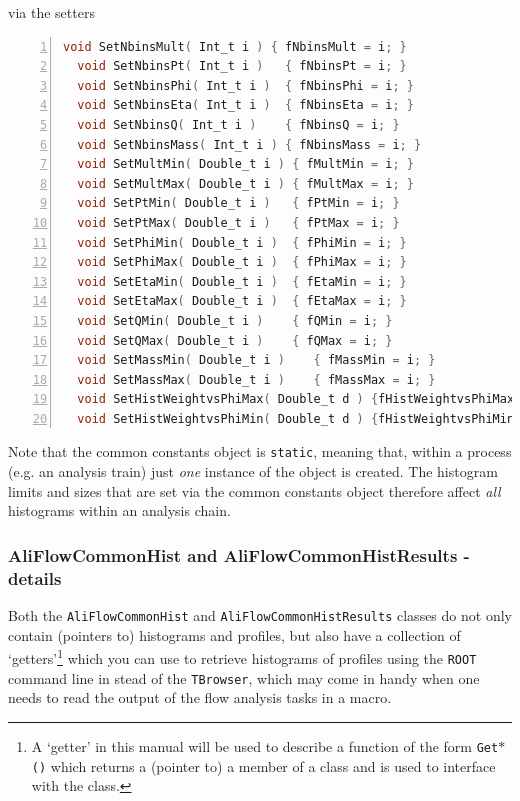 \documentclass[a4paper]{book}
\numberwithin{equation}{subsection}
\begin{document}
  via the setters
  
  \begin{lstlisting}[language=C, numbers=left]
    void SetNbinsMult( Int_t i ) { fNbinsMult = i; }
  void SetNbinsPt( Int_t i )   { fNbinsPt = i; }
  void SetNbinsPhi( Int_t i )  { fNbinsPhi = i; }
  void SetNbinsEta( Int_t i )  { fNbinsEta = i; }
  void SetNbinsQ( Int_t i )    { fNbinsQ = i; }
  void SetNbinsMass( Int_t i ) { fNbinsMass = i; }
  void SetMultMin( Double_t i ) { fMultMin = i; }
  void SetMultMax( Double_t i ) { fMultMax = i; }
  void SetPtMin( Double_t i )   { fPtMin = i; }
  void SetPtMax( Double_t i )   { fPtMax = i; }
  void SetPhiMin( Double_t i )  { fPhiMin = i; }
  void SetPhiMax( Double_t i )  { fPhiMax = i; }
  void SetEtaMin( Double_t i )  { fEtaMin = i; }
  void SetEtaMax( Double_t i )  { fEtaMax = i; }
  void SetQMin( Double_t i )    { fQMin = i; }
  void SetQMax( Double_t i )    { fQMax = i; }
  void SetMassMin( Double_t i )    { fMassMin = i; }
  void SetMassMax( Double_t i )    { fMassMax = i; }
  void SetHistWeightvsPhiMax( Double_t d ) {fHistWeightvsPhiMax=d;}
  void SetHistWeightvsPhiMin( Double_t d ) {fHistWeightvsPhiMin=d;}\end{lstlisting} 

Note that the common constants object is \texttt{static}, meaning that, within a process (e.g. an analysis train) just \emph{one} instance of the object is created. The histogram limits and sizes that are set via the common constants object therefore affect \emph{all} histograms within an analysis chain.

\subsubsection{AliFlowCommonHist and AliFlowCommonHistResults - details}
Both the \texttt{AliFlowCommonHist} and \texttt{AliFlowCommonHistResults} classes do not only contain (pointers to) histograms and profiles, but also have a collection of `getters'\footnote{A `getter' in this manual will be used to describe a function of the form \texttt{Get$\ast$()} which returns a (pointer to) a member of a class and is used to interface with the class.} which you can use to retrieve histograms of profiles using the \texttt{ROOT} command line in stead of the \texttt{TBrowser}, which may come in handy when one needs to read the output of the flow analysis tasks in a macro. 
\end{document}
